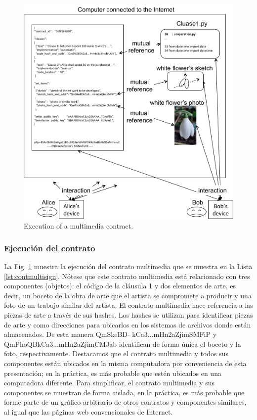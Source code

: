 \documentclass[12pt]{report} %
\begin{document}
\begin{figure}
\centering
\includegraphics[width=0.98\columnwidth]{figures/execontmulti.pdf}
\caption{Execution of a multimedia contract.} 
\label{fig:execontmulti}
\end{figure}
 



\subsubsection{Ejecución del contrato}

La Fig. \ref{fig:execontmulti} muestra la ejecución del contrato multimedia que se muestra en la Lista \ref{lst:contmultisign}. Nótese que este contrato multimedia está relacionado con tres componentes (objetos): el código de la cláusula 1 y dos elementos de arte, es decir, un boceto de la obra de arte que el artista se compromete a producir y una foto de un trabajo similar del artista. El contrato multimedia hace referencia a las piezas de arte a través de sus hashes. Los hashes se utilizan para identificar piezas de arte y como direcciones para ubicarlos en los sistemas de archivos donde están almacenados. De esta manera QmSkeBD-
kCa3...mHn2aZjimSMFiP y QmPhoQBkCa3...mHn2aZjimCMJab identifican de forma única el boceto y la foto, respectivamente. Destacamos que el contrato multimedia y todos sus componentes están ubicados en la misma computadora por conveniencia de esta presentación; en la práctica, es más probable que estén ubicados en una computadora diferente. Para simplificar, el contrato multimedia y sus componentes se muestran de forma aislada, en la práctica, es más probable que forme parte de un gráfico arbitrario de otros contratos y componentes similares, al igual que las páginas web  convencionales de Internet.
\end{document}
